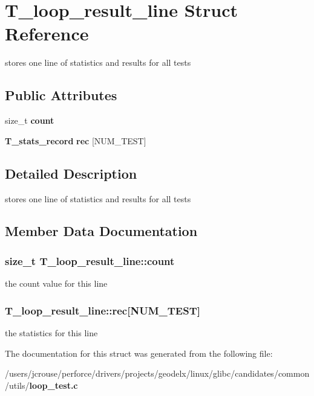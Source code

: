 \section{T\_\-loop\_\-result\_\-line Struct Reference}
\label{structT__loop__result__line}
stores one line of statistics and results for all tests 


\subsection*{Public Attributes}
\begin{CompactItemize}
\item 
size\_\-t {\bf count}
\item 
{\bf T\_\-stats\_\-record} {\bf rec} [NUM\_\-TEST]
\end{CompactItemize}


\subsection{Detailed Description}
stores one line of statistics and results for all tests



\subsection{Member Data Documentation}
\subsubsection{\setlength{\rightskip}{0pt plus 5cm}size\_\-t T\_\-loop\_\-result\_\-line::count}\label{structT__loop__result__line_m0}


the count value for this line 
\subsubsection{ T\_\-loop\_\-result\_\-line::rec[NUM\_\-TEST]}\label{structT__loop__result__line_m1}


the statistics for this line 

The documentation for this struct was generated from the following file:\begin{CompactItemize}
\item 
/users/jcrouse/perforce/drivers/projects/geodelx/linux/glibc/candidates/common/utils/{\bf loop\_\-test.c}\end{CompactItemize}
